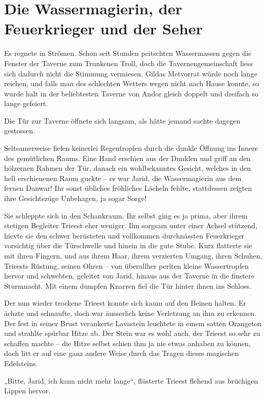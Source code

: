 \newpage
\section{Die Wassermagierin, der Feuerkrieger und der Seher}



Es regnete in Strömen. Schon seit Stunden peitschten Wassermassen gegen die Fenster der Taverne zum Trunkenen Troll, doch die Tavernengemeinschaft liess sich dadurch nicht die Stimmung vermiesen. Gildas Metvorrat würde noch lange reichen, und falls man des schlechten Wetters wegen nicht nach Hause konnte, so wurde halt in der beliebtesten Taverne von Andor gleich doppelt und dreifach so lange gefeiert.

Die Tür zur Taverne öffnete sich langsam, als hätte jemand sachte dagegen gestossen.

Seltsamerweise fielen keinerlei Regentropfen durch die dunkle Öffnung ins Innere des gemütlichen Raums. Eine Hand erschien aus der Dunklen und griff an den hölzernen Rahmen der Tür, danach ein wohlbekanntes Gesicht, welches in den hell erschienenen Raum guckte – es war Jarid, die Wassermagierin aus dem fernen Danwar! Ihr sonst übliches fröhliches Lächeln fehlte, stattdessen zeigten ihre Gesichtszüge Unbehagen, ja sogar Sorge!

Sie schleppte sich in den Schankraum. Ihr selbst ging es ja prima, aber ihrem stetigen Begleiter Trieest eher weniger. Ihn sorgsam unter einer Achsel stützend, hievte sie den schwer berüsteten und vollkommen durchnässten Feuerkrieger vorsichtig über die Türschwelle und hinein in die gute Stube. Kurz flatterte sie mit ihren Fingern, und aus ihrem Haar, ihrem verzierten Umgang, ihren Schuhen, Trieests Rüstung, seinen Ohren – von überallher perlten kleine Wassertropfen hervor und schwebten, geleitet von Jarid, hinaus aus der Taverne in die finstere Sturmnacht. Mit einem dumpfen Knarren fiel die Tür hinter ihnen ins Schloss.

Der nun wieder trockene Trieest konnte sich kaum auf den Beinen halten. Er ächzte und schnaufte, doch war äusserlich keine Verletzung an ihm zu erkennen. Der fest in seiner Brust verankerte Lavastein leuchtete in einem satten Orangeton und strahlte spürbar Hitze ab. Der Stein war es wohl auch, der Trieest so sehr zu schaffen machte – die Hitze selbst schien ihm ja nie etwas anhaben zu können, doch litt er auf eine ganz andere Weise durch das Tragen dieses magischen Edelsteins.

„Bitte, Jarid, ich kann nicht mehr lange“, flüsterte Trieest flehend aus brüchigen Lippen hervor.

